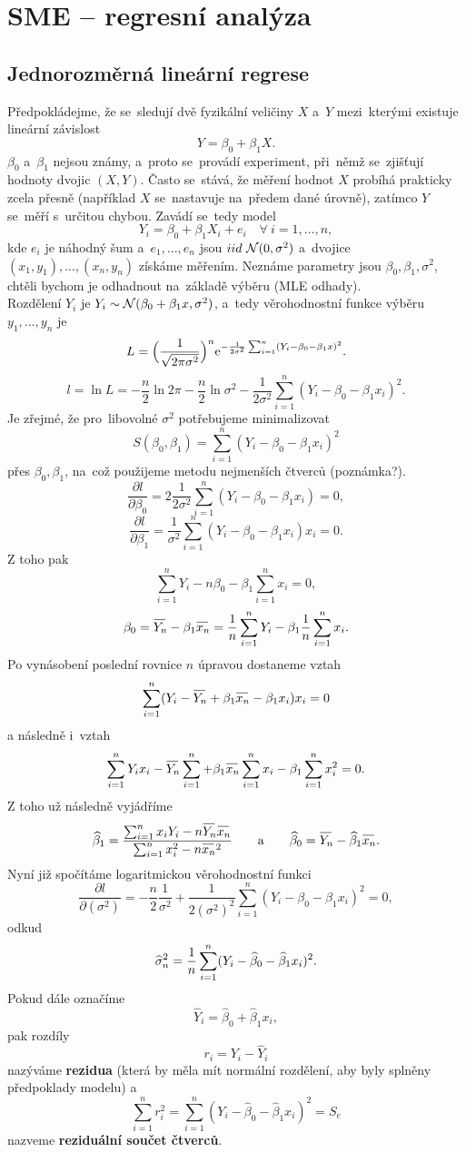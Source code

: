 \chapter{SME -- regresní analýza}
\section{Jednorozměrná lineární regrese}
Předpokládejme, že se~sledují dvě fyzikální veličiny $X$ a~$Y$ mezi~kterými existuje lineární závislost
$$Y=\beta_0+\beta_1X .$$
$\beta_0$ a~$\beta_1$ nejsou známy, a~proto se~provádí experiment, při~němž se~zjišťují hodnoty dvojic $(X,Y)$. Často se~stává, že měření hodnot $X$ probíhá prakticky zcela přesně (například $X$ se~nastavuje na~předem dané úrovně), zatímco $Y$ se~měří s~určitou chybou. Zavádí se~tedy model
$$Y_i=\beta_0 +\beta_1X_i + e_i \quad \forall~i=1,...,n,$$
kde $e_i$ je náhodný šum a~$e_1,...,e_n$ jsou $iid~\mathcal{N}(0,{\sigma}^2)$ a~dvojice $(x_1,y_1),...,(x_n,y_n)$ získáme měřením. Neznáme parametry jsou $\beta_0,\beta_1, {\sigma}^2$, chtěli bychom je odhadnout na~základě výběru (MLE odhady).\\

Rozdělení $Y_i$ je $Y_i\sim\mathcal{N}(\beta_0 + \beta_1x,{\sigma}^2)$, a~tedy věrohodnostní funkce výběru $y_1,...,y_n$ je
$$L=\Bigl(\frac{1}{\sqrt{2\pi{\sigma}^2}}\Bigr)^n \mathrm{e}^{-\frac{1}{2{\sigma}^2}\sum_{i=1}^{n}(Y_i-\beta_0-\beta_1x)^2}.$$
$$l=\ln L=-\frac{n}{2}\ln{2\pi}-\frac{n}{2}\ln{{\sigma}^2}-\frac{1}{2{\sigma}^2}\sum_{i=1}^{n}(Y_i-\beta_0-\beta_1x_i)^2.$$
Je zřejmé, že pro~libovolné ${\sigma}^2$ potřebujeme minimalizovat
$$S(\beta_0,\beta_1)=\sum_{i=1}^{n}(Y_i-\beta_0-\beta_1x_i)^2   $$
přes $\beta_0,\beta_1$, na~což použijeme metodu nejmenších čtverců (poznámka?).
$$\frac{\partial l}{\partial \beta_0}=2\frac{1}{2{\sigma}^2}\sum_{i=1}^{n}(Y_i-\beta_0-\beta_1x_i)=0,  $$
$$\frac{\partial l}{\partial \beta_1}=\frac{1}{{\sigma}^2}\sum_{i=1}^{n}(Y_i-\beta_0-\beta_1x_i) x_i=0. $$
Z toho pak
$$  \sum_{i=1}^{n} Y_i -n\beta_0-\beta_1 \sum_{i=1}^{n} x_i=0, $$
$$ \beta_0=\Oyn -\beta_1\oxnn=\frac{1}{n}\sum_{i=1}^{n}Y_i-\beta_1\frac{1}{n}\sum_{i=1}^{n}x_i.$$
Po vynásobení poslední rovnice $n$ úpravou dostaneme vztah
$$\sum_{i=1}^{n}(Y_i-\Oyn+\beta_1\oxnn-\beta_1x_i)x_i=0  $$
a následně i~vztah
$$ \sum_{i=1}^{n}Y_ix_i-\Oyn\sum_{i=1}^{n}+\beta_1\oxnn\sum_{i=1}^{n}x_i-\beta_1\sum_{i=1}^{n}x_i^2=0. $$
Z toho už následně vyjádříme
$$ \widehat{\beta}_1=\frac{\sum_{i=1}^{n}x_iY_i-n\Oyn\oxnn}{\sum_{i=1}^{n}x_i^2-n\oxnn^2}\qquad\text{a}\qquad \widehat{\beta}_0=\Oyn-\widehat{\beta}_1\oxnn. $$
Nyní již spočítáme logaritmickou věrohodnostní funkci
$$\frac{\partial l}{\partial ({\sigma}^2)}=-\frac{n}{2}\frac{1}{{\sigma}^2}+\frac{1}{2({\sigma}^2)^2}\sum_{i=1}^{n}(Y_i-\beta_0-\beta_1x_i)^2=0,$$
odkud
$$\widehat{\sigma}_n^2=\frac{1}{n}\sum_{i=1}^{n}(Y_i-\widehat{\beta}_0-\widehat{\beta}_1x_i)^2. $$
Pokud dále označíme
$$\widehat{Y}_i=\widehat{\beta}_0+\widehat{\beta}_1x_i, $$
pak rozdíly
$$r_i=Y_i-\widehat{Y}_i $$
nazýváme \textbf{rezidua} (která by měla mít normální rozdělení, aby byly splněny předpoklady modelu) a~
$$ \sum_{i=1}^{n}r_i^2=\sum_{i=1}^{n}(Y_i-\widehat{\beta}_0-\widehat{\beta}_1x_i)^2=S_e  $$
nazveme \textbf{reziduální součet čtverců}.
